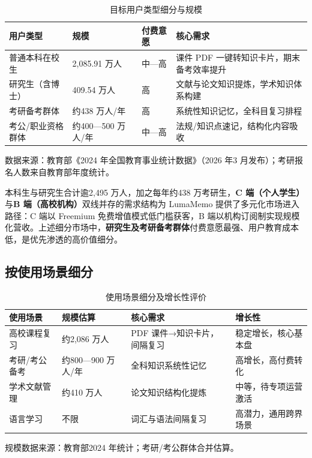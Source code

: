 \begin{table}[htbp]
  \centering
  \caption{目标用户类型细分与规模}
  \label{tab:user_segment}
  \begin{tabular}{p{3.2cm}p{2.8cm}p{1.8cm}p{4.5cm}}
    \toprule
    \textbf{用户类型} & \textbf{规模} & \textbf{付费意愿} & \textbf{核心需求} \\
    \midrule
    普通本科在校生 & 2,085.91 万人 & 中—高 & 课件 PDF 一键转知识卡片，期末备考效率提升 \\[4pt]
    研究生（含博士） & 409.54 万人 & 高 & 文献与论文知识提炼，学术知识体系构建 \\[4pt]
    考研备考群体 & 约438 万人/年 & 高 & 系统性知识记忆，全科目复习排程 \\[4pt]
    考公/职业资格群体 & 约400—500 万人/年 & 中—高 & 法规/知识点速记，结构化内容吸收 \\
    \bottomrule
  \end{tabular}
  \begin{flushleft}
    \footnotesize 数据来源：教育部《2024 年全国教育事业统计数据》（2026 年3 月发布）；考研报名人数来自教育部年度统计。
  \end{flushleft}
\end{table}

本科生与研究生合计逾2,495 万人，加之每年约438 万考研生，\textbf{C 端（个人学生）}与\textbf{B 端（高校机构）}双线并存的需求结构为 LumaMemo 提供了多元化市场进入路径：C 端以 Freemium 免费增值模式低门槛获客，B 端以机构订阅制实现规模化营收。上述细分市场中，\textbf{研究生及考研备考群体}付费意愿最强、用户教育成本低，是优先渗透的高价值细分。

\subsection{按使用场景细分}

\begin{table}[htbp]
  \centering
  \caption{使用场景细分及增长性评价}
  \label{tab:scene_segment}
  \begin{tabular}{p{3.0cm}p{2.5cm}p{3.5cm}p{3.5cm}}
    \toprule
    \textbf{使用场景} & \textbf{规模估算} & \textbf{核心需求} & \textbf{增长性} \\
    \midrule
    高校课程复习 & 约2,086 万人 & PDF 课件→知识卡片，间隔复习 & 稳定增长，核心基本盘 \\[4pt]
    考研/考公备考 & 约800—900 万人/年 & 全科知识系统性记忆 & 高增长，高付费转化 \\[4pt]
    学术文献管理 & 约410 万人 & 论文知识结构化提炼 & 中等，待专项运营激活 \\[4pt]
    语言学习 & 不限 & 词汇与语法间隔复习 & 高潜力，通用跨界场景 \\
    \bottomrule
  \end{tabular}
  \begin{flushleft}
    \footnotesize 规模数据来源：教育部2024 年统计；考研/考公群体合并估算。
  \end{flushleft}
\end{table}

